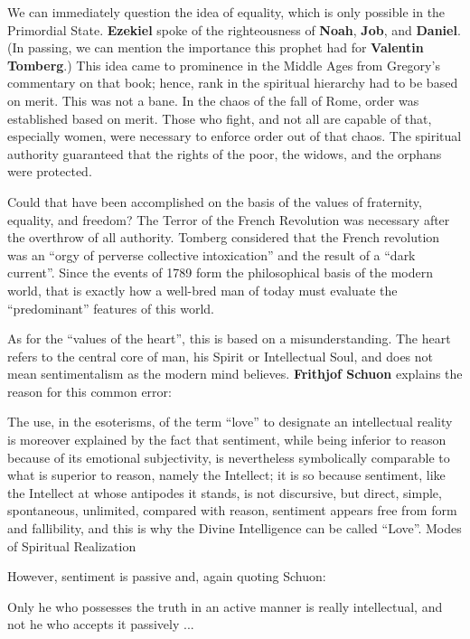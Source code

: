 We can immediately question the idea of equality, which is only possible in the Primordial State. \textbf{Ezekiel} spoke of the righteousness of \textbf{Noah}, \textbf{Job}, and \textbf{Daniel}. (In passing, we can mention the importance this prophet had for \textbf{Valentin Tomberg}.) This idea came to prominence in the Middle Ages from Gregory's commentary on that book; hence, rank in the spiritual hierarchy had to be based on merit. This was not a bane. In the chaos of the fall of Rome, order was established based on merit. Those who fight, and not all are capable of that, especially women, were necessary to enforce order out of that chaos. The spiritual authority guaranteed that the rights of the poor, the widows, and the orphans were protected.

Could that have been accomplished on the basis of the values of fraternity, equality, and freedom? The Terror of the French Revolution was necessary after the overthrow of all authority. Tomberg considered that the French revolution was an ``orgy of perverse collective intoxication'' and the result of a ``dark current''. Since the events of 1789 form the philosophical basis of the modern world, that is exactly how a well-bred man of today must evaluate the ``predominant'' features of this world.

As for the ``values of the heart'', this is based on a misunderstanding. The heart refers to the central core of man, his Spirit or Intellectual Soul, and does not mean sentimentalism as the modern mind believes. \textbf{Frithjof Schuon} explains the reason for this common error:


\begin{quotex}
The use, in the esoterisms, of the term ``love'' to designate an intellectual reality is moreover explained by the fact that sentiment, while being inferior to reason because of its emotional subjectivity, is nevertheless symbolically comparable to what is superior to reason, namely the Intellect; it is so because sentiment, like the Intellect at whose antipodes it stands, is not discursive, but direct, simple, spontaneous, unlimited, compared with reason, sentiment appears free from form and fallibility, and this is why the Divine Intelligence can be called ``Love''. Modes of Spiritual Realization \end{quotex}


However, sentiment is passive and, again quoting Schuon:

\begin{quotex}
Only he who possesses the truth in an active manner is really intellectual, and not he who accepts it passively ... \end{quotex}


